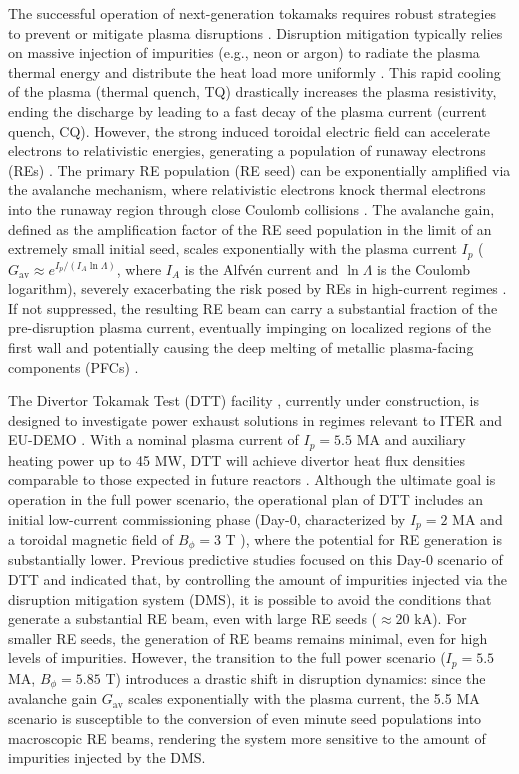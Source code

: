 \documentclass[aip,reprint]{revtex4-1}
\begin{document}
The successful operation of next-generation tokamaks requires robust strategies to prevent or mitigate plasma disruptions \cite{Iter1999a, Hender2007}. Disruption mitigation typically relies on massive injection of impurities (e.g., neon or argon) to radiate the plasma thermal energy and distribute the heat load more uniformly \cite{Iter1999a, Hender2007}. This rapid cooling of the plasma (thermal quench, TQ) drastically increases the plasma resistivity, ending the discharge by leading to a fast decay of the plasma current (current quench, CQ). However, the strong induced toroidal electric field can accelerate electrons to relativistic energies, generating a population of runaway electrons (REs) \cite{Boozer2018, Breizman2019}. The primary RE population (RE seed) can be exponentially amplified via the avalanche mechanism, where relativistic electrons knock thermal electrons into the runaway region through close Coulomb collisions \cite{Rosenbluth1997}. The avalanche gain, defined as the amplification factor of the RE seed population in the limit of an extremely small initial seed, scales exponentially with the plasma current $I_p$ ($G_\text{av} \approx e^{I_p/(I_A \ln \Lambda)}$, where $I_A$ is the Alfvén current and $\ln \Lambda$ is the Coulomb logarithm), severely exacerbating the risk posed by REs in high-current regimes \cite{Rosenbluth1997}. If not suppressed, the resulting RE beam can carry a substantial fraction of the pre-disruption plasma current, eventually impinging on localized regions of the first wall and potentially causing the deep melting of metallic plasma-facing components (PFCs) \cite{Hender2007, Matthews2016, Ratynskaia2025}.

The Divertor Tokamak Test (DTT) facility \cite{Martone2019, Romanelli2024}, currently under construction, is designed to investigate power exhaust solutions in regimes relevant to ITER \cite{Iter1999b} and EU-DEMO \cite{Federici2019}. With a nominal plasma current of $I_p = 5.5$ MA and auxiliary heating power up to 45 MW, DTT will achieve divertor heat flux densities comparable to those expected in future reactors \cite{Romanelli2024}. Although the ultimate goal is operation in the full power scenario, the operational plan of DTT includes an initial low-current commissioning phase (Day-0, characterized by $I_p=2$ MA and a toroidal magnetic field of $B_\phi = 3$ T \cite{Casiraghi2023}), where the potential for RE generation is substantially lower. Previous predictive studies \cite{Emanuelli2025} focused on this Day-0 scenario of DTT and indicated that, by controlling the amount of impurities injected via the disruption mitigation system (DMS), it is possible to avoid the conditions that generate a substantial RE beam, even with large RE seeds ($\approx 20$ kA). For smaller RE seeds, the generation of RE beams remains minimal, even for high levels of impurities. However, the transition to the full power scenario ($I_p = 5.5$ MA, $B_\phi = 5.85$ T) introduces a drastic shift in disruption dynamics: since the avalanche gain $G_\text{av}$ scales exponentially with the plasma current, the 5.5 MA scenario is susceptible to the conversion of even minute seed populations into macroscopic RE beams, rendering the system more sensitive to the amount of impurities injected by the DMS. 
\end{document}
